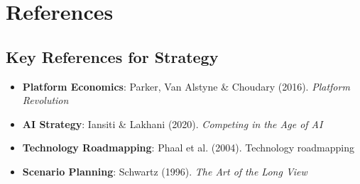 \section{References}
\label{sec:vvv-references}

\subsection{Key References for Strategy}

\begin{itemize}[nosep]
\item \textbf{Platform Economics}: Parker, Van Alstyne \& Choudary (2016). \textit{Platform Revolution}
\item \textbf{AI Strategy}: Iansiti \& Lakhani (2020). \textit{Competing in the Age of AI}
\item \textbf{Technology Roadmapping}: Phaal et al. (2004). Technology roadmapping
\item \textbf{Scenario Planning}: Schwartz (1996). \textit{The Art of the Long View}
\end{itemize}

